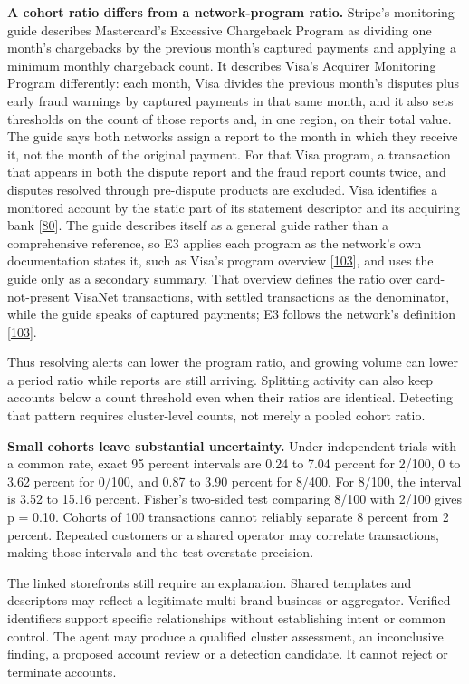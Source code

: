 \documentclass[
  11pt,
]{article}
\begin{document}
\textbf{A cohort ratio differs from a network-program ratio.} Stripe's
monitoring guide describes Mastercard's Excessive Chargeback Program as
dividing one month's chargebacks by the previous month's captured
payments and applying a minimum monthly chargeback count. It describes
Visa's Acquirer Monitoring Program differently: each month, Visa divides
the previous month's disputes plus early fraud warnings by captured
payments in that same month, and it also sets thresholds on the count of
those reports and, in one region, on their total value. The guide says
both networks assign a report to the month in which they receive it, not
the month of the original payment. For that Visa program, a transaction
that appears in both the dispute report and the fraud report counts
twice, and disputes resolved through pre-dispute products are excluded.
Visa identifies a monitored account by the static part of its statement
descriptor and its acquiring bank
{[}\protect\hyperlink{ref-Stripe2026MonitoringPrograms}{80}{]}. The
guide describes itself as a general guide rather than a comprehensive
reference, so E3 applies each program as the network's own documentation
states it, such as Visa's program overview
{[}\protect\hyperlink{ref-Visa2025VAMP}{103}{]}, and uses the guide only
as a secondary summary. That overview defines the ratio over
card-not-present VisaNet transactions, with settled transactions as the
denominator, while the guide speaks of captured payments; E3 follows the
network's definition {[}\protect\hyperlink{ref-Visa2025VAMP}{103}{]}.

Thus resolving alerts can lower the program ratio, and growing volume
can lower a period ratio while reports are still arriving. Splitting
activity can also keep accounts below a count threshold even when their
ratios are identical. Detecting that pattern requires cluster-level
counts, not merely a pooled cohort ratio.

\textbf{Small cohorts leave substantial uncertainty.} Under independent
trials with a common rate, exact 95 percent intervals are 0.24 to 7.04
percent for 2/100, 0 to 3.62 percent for 0/100, and 0.87 to 3.90 percent
for 8/400. For 8/100, the interval is 3.52 to 15.16 percent. Fisher's
two-sided test comparing 8/100 with 2/100 gives p = 0.10. Cohorts of 100
transactions cannot reliably separate 8 percent from 2 percent. Repeated
customers or a shared operator may correlate transactions, making those
intervals and the test overstate precision.

The linked storefronts still require an explanation. Shared templates
and descriptors may reflect a legitimate multi-brand business or
aggregator. Verified identifiers support specific relationships without
establishing intent or common control. The agent may produce a qualified
cluster assessment, an inconclusive finding, a proposed account review
or a detection candidate. It cannot reject or terminate accounts.
\end{document}
